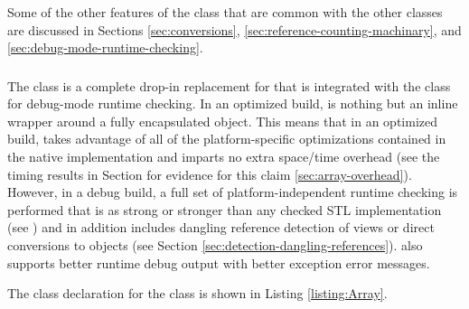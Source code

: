 \documentclass[pdf,ps2pdf,11pt]{SANDreport}
\begin{document}
Some of the other features of the {} class that are
common with the other classes are discussed in Sections
{}\ref{sec:conversions}, {}\ref{sec:reference-counting-machinary}, and
{}\ref{sec:debug-mode-runtime-checking}.


%
{}\subsubsection{}
\label{sec:Array}
%

The class {} is a complete drop-in replacement for
{} that is integrated with the {} class for
debug-mode runtime checking.  In an optimized build, {} is nothing
but an inline wrapper around a fully encapsulated {} object.
This means that in an optimized build, {} takes advantage of all of
the platform-specific optimizations contained in the native
{} implementation and imparts no extra space/time overhead
(see the timing results in Section for evidence for this claim
{}\ref{sec:array-overhead}).  However, in a debug build, a full set of
platform-independent runtime checking is performed that is as strong or
stronger than any checked STL implementation (see {}\cite[Item
{}83]{C++CodingStandards05}) and in addition includes dangling reference
detection of {} views or direct conversions to {}
objects (see Section {}\ref{sec:detection-dangling-references}).
{} also supports better runtime debug output with better exception
error messages.

The class declaration for the {} class is shown in
Listing {}\ref{listing:Array}.
\end{document}
